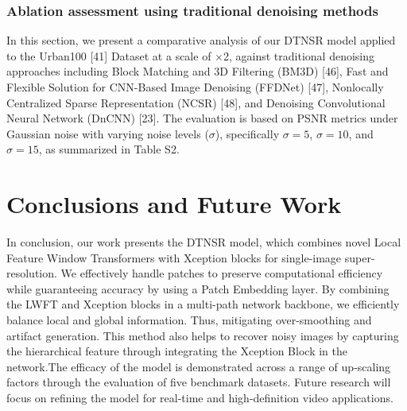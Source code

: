 \documentclass[journal]{IEEEtran}
\begin{document}
\subsubsection{Ablation assessment using traditional denoising methods} 
In this section, we present a comparative analysis of our DTNSR model applied to the Urban100 [41] Dataset at a scale of $\times$2, against traditional denoising approaches including Block Matching and 3D Filtering (BM3D) [46], Fast and Flexible Solution for CNN-Based Image Denoising (FFDNet) [47], Nonlocally Centralized Sparse Representation (NCSR) [48],  and Denoising Convolutional Neural Network (DnCNN) [23]. The evaluation is based on PSNR metrics under Gaussian noise with varying noise levels ($\sigma$), specifically $\sigma = 5$, $\sigma = 10$, and $\sigma = 15$, as summarized in Table S2. 

\section{Conclusions and Future Work}

In conclusion, our work presents the DTNSR model, which combines novel Local Feature Window Transformers with Xception blocks for single-image super-resolution. We effectively handle patches to preserve computational efficiency while guaranteeing accuracy by using a Patch Embedding layer. By combining the LWFT and Xception blocks in a multi-path network backbone, we efficiently balance local and global information. Thus, mitigating over-smoothing and artifact generation. This method also helps to recover noisy images by capturing the hierarchical feature through integrating the Xception Block in the network.The efficacy of the model is demonstrated across a range of up-scaling factors through the evaluation of five benchmark datasets. Future research will focus on refining the model for real-time and high-definition video applications.
\end{document}
